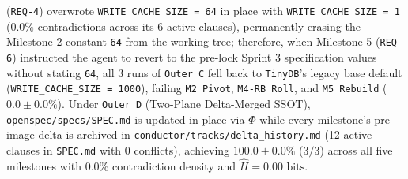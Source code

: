 \documentclass[11pt,a4paper,copyright]{google}
\begin{document}
(\texttt{REQ-4}) overwrote \texttt{WRITE\_CACHE\_SIZE = 64} in place with \texttt{WRITE\_CACHE\_SIZE = 1} ($0.0\%$ contradictions across its 6 active clauses), permanently erasing the Milestone 2 constant \texttt{64} from the working tree; therefore, when Milestone 5 (\texttt{REQ-6}) instructed the agent to revert to the pre-lock Sprint 3 specification values without stating \texttt{64}, all 3 runs of \texttt{Outer C} fell back to \texttt{TinyDB}'s legacy base default (\texttt{WRITE\_CACHE\_SIZE = 1000}), failing \texttt{M2 Pivot}, \texttt{M4-RB Roll}, and \texttt{M5 Rebuild} ($0.0 \pm 0.0\%$). Under \texttt{Outer D} (Two-Plane Delta-Merged SSOT), \texttt{openspec/specs/\allowbreak SPEC.md} is updated in place via $\Phi$ while every milestone's pre-image delta is archived in \texttt{conductor/tracks/\allowbreak delta\_history.md} (12 active clauses in \texttt{SPEC.md} with 0 conflicts), achieving $100.0 \pm 0.0\%$ ($3/3$) across all five milestones with $0.0\%$ contradiction density and $\hat{H} = 0.00\text{ bits}$.
\end{document}

